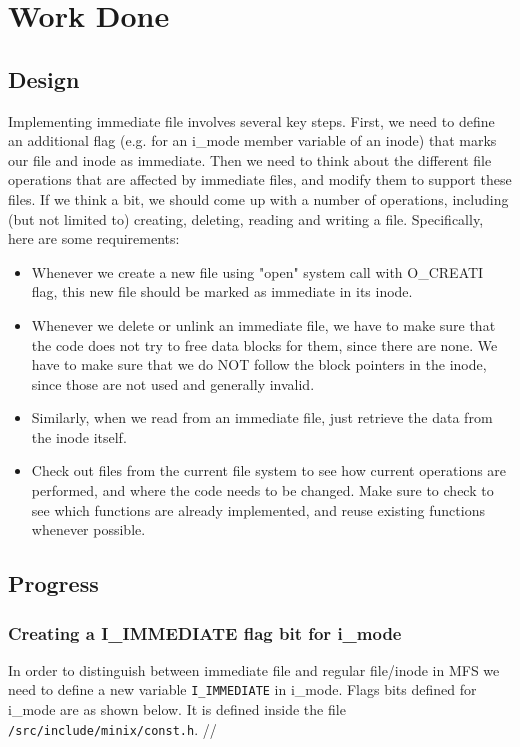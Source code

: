 \chapter{Work Done}

\section{Design}

Implementing immediate file involves several key steps. First, we need to define an additional flag (e.g. for an i\_mode member variable of an inode) that marks our file and inode as immediate. Then we need to think about the different file operations that are affected by immediate files, and modify them to support these files. If we think a bit, we should come up with a number of operations, including (but not limited to) creating, deleting, reading and writing a file. Specifically, here are some requirements:

\begin{itemize}

\item Whenever we create a new file using "open" system call with O\_CREATI flag, this new file should be marked as immediate in its inode.

\item Whenever we delete or unlink an immediate file, we have to make sure that the code does not try to free data blocks for them, since there are none. We have to make sure that we do NOT follow the block pointers in the inode, since those are not used and generally invalid.

\item Similarly, when we read from an immediate file, just retrieve the data from the inode itself.

\item Check out files from the current file system to see how current operations are performed, and where the code needs to be changed. Make sure to check to see which functions are already implemented, and reuse existing functions whenever possible.
\end{itemize}
   
\section{Progress}
\subsection{Creating a I\_IMMEDIATE flag bit for i\_mode}
In order to distinguish between immediate file and regular file/inode in MFS we need to define a new variable \texttt{I\_IMMEDIATE} in i\_mode. Flags bits defined for i\_mode are as shown below. It is defined inside the file \texttt{/src/include/minix/const.h}.
//

